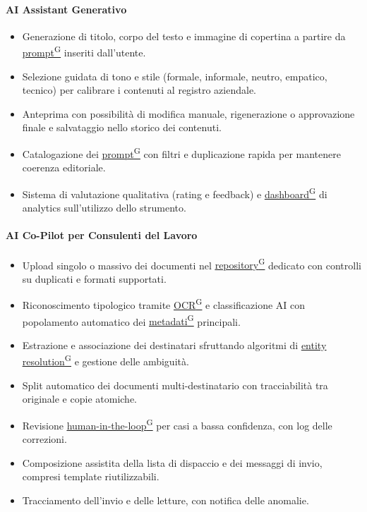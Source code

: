 ﻿\documentclass[a4paper,12pt]{article}
\providecommand{\glslink}[2]{\href{https://alittlebyte-19.github.io/Documentazione/glossario.html\#gls-#1}{\underline{#2}\textsuperscript{\scriptsize G}}}
\begin{document}
\paragraph{AI Assistant Generativo}
\begin{itemize}
    \item Generazione di titolo, corpo del testo e immagine di copertina a partire da \glslink{prompt}{prompt} inseriti dall'utente.
    \item Selezione guidata di tono e stile (formale, informale, neutro, empatico, tecnico) per calibrare i contenuti al registro aziendale.
    \item Anteprima con possibilità di modifica manuale, rigenerazione o approvazione finale e salvataggio nello storico dei contenuti.
    \item Catalogazione dei \glslink{prompt}{prompt} con filtri e duplicazione rapida per mantenere coerenza editoriale.
    \item Sistema di valutazione qualitativa (rating e feedback) e \glslink{dashboard}{dashboard} di analytics sull'utilizzo dello strumento.
\end{itemize}

\paragraph{AI Co-Pilot per Consulenti del Lavoro}
\begin{itemize}
    \item Upload singolo o massivo dei documenti nel \glslink{repository}{repository} dedicato con controlli su duplicati e formati supportati.
    \item Riconoscimento tipologico tramite \glslink{ocr-riconoscimento-ottico-dei-caratteri}{OCR} e classificazione AI con popolamento automatico dei \glslink{metadati}{metadati} principali.
    \item Estrazione e associazione dei destinatari sfruttando algoritmi di \glslink{entity-resolution}{entity resolution} e gestione delle ambiguità.
    \item Split automatico dei documenti multi-destinatario con tracciabilità tra originale e copie atomiche.
    \item Revisione \glslink{human-in-the-loop}{human-in-the-loop} per casi a bassa confidenza, con log delle correzioni.
    \item Composizione assistita della lista di dispaccio e dei messaggi di invio, compresi template riutilizzabili.
    \item Tracciamento dell'invio e delle letture, con notifica delle anomalie.
\end{itemize}
\end{document}
